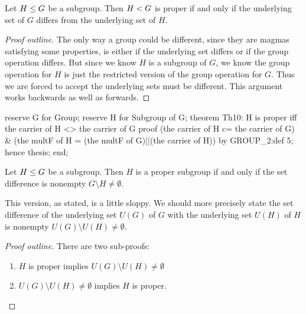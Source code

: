 \begin{theorem}
Let $H\leq G$ be a subgroup. Then $H< G$ is proper if
and only if the underlying set of $G$ differs from the underlying set of $H$.
\end{theorem}

\begin{proof}[Proof outline]
The only way a group could be different, since they are magmas
satisfying some properties, is either if the underlying set differs or
if the group operation differs. But since we know $H$ is a subgroup of
$G$, we know the group operation for $H$ is just the restricted version
of the group operation for $G$. Thus we are forced to accept the
underlying sets must be different. This argument works backwards as well
as forwards.
\end{proof}

\nwenddocs{}\endmoddef\nwstartdeflinemarkup{}\nwenddeflinemarkup
reserve G for Group;
reserve H for Subgroup of G;
theorem Th10:
  H is proper iff the carrier of H <> the carrier of G
proof
  (the carrier of H c= the carrier of G) & (the multF of H =
  (the multF of G)||(the carrier of H)) by GROUP_2:def 5;
  hence thesis;
end;
\eatline
{}\nwendcode{}\nwdocspar
\begin{theorem}\label{thm:characteristic:preparatory:proper-subgroups-have-set-diff-neq-empty}
  Let $H\leq G$ be a subgroup.
  Then $H$ is a proper subgroup if and only if the set difference is nonempty
  $G\setminus H\neq\emptyset$.
\end{theorem}

\begin{thm-remark}
This version, as stated, is a little sloppy. We should more precisely
state the set difference of the underlying set $U(G)$ of $G$ with the
underlying set $U(H)$ of $H$ is nonempty $U(G)\setminus U(H)\neq\emptyset$.
\end{thm-remark}

\begin{proof}[Proof outline]
  There are two sub-proofs:
  \begin{enumerate}
  \item $H$ is proper implies $U(G)\setminus U(H)\neq\emptyset$
  \item $U(G)\setminus U(H)\neq\emptyset$ implies $H$ is proper.\qedhere
  \end{enumerate}
\end{proof}

